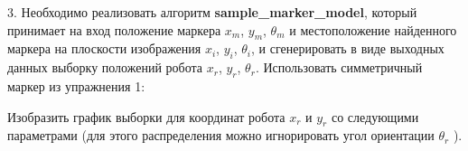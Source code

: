 \documentclass[10pt,a4paper]{article}
\begin{document}
3. Необходимо реализовать алгоритм \textbf{sample\_marker\_model}, который принимает на вход положение маркера $x_m$, $y_m$, $\theta_m$ и местоположение найденного маркера на плоскости изображения $x_i$, $y_i$, $\theta_i$, и сгенерировать в виде выходных данных выборку положений робота $x_r$, $y_r$, $\theta_r$. Использовать симметричный маркер из упражнения 1:

\begin{figure}[H]
	\label{fig:614orig}
\end{figure}

Изобразить график выборки для координат робота $x_r$ и $y_r$ со следующими параметрами (для этого распределения можно игнорировать угол ориентации $\theta_r$ ).
\end{document}
